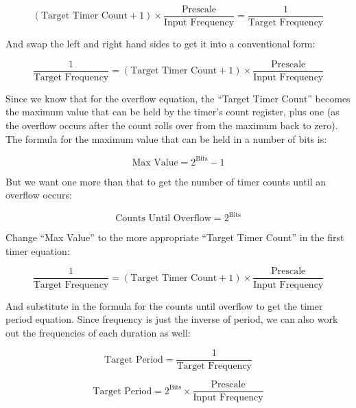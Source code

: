 \documentclass[a4paper,oneside,notitlepage]{book}
\begin{document}
\begin{displaymath}
(\text{Target Timer Count} + 1) \times \frac{\text{Prescale}}{\text{Input Frequency}} = \frac{1}{\text{Target Frequency}}
\end{displaymath}

And swap the left and right hand sides to get it into a conventional form:

\begin{displaymath}
\frac{1}{\text{Target Frequency}} = (\text{Target Timer Count} + 1) \times \frac{\text{Prescale}}{\text{Input Frequency}}
\end{displaymath}

Since we know that for the overflow equation, the ``Target Timer Count'' becomes the maximum value that can be held by the timer's count register, plus one (as the overflow occurs after the count rolls over from the maximum back to zero). The formula for the maximum value that can be held in a number of bits is:

\begin{displaymath}
\text{Max Value} = 2^\text{Bits} - 1
\end{displaymath}

But we want one more than that to get the number of timer counts until an overflow occurs:

\begin{displaymath}
\text{Counts Until Overflow} = 2^\text{Bits}
\end{displaymath}

Change ``Max Value'' to the more appropriate ``Target Timer Count'' in the first timer equation:

\begin{displaymath}
\frac{1}{\text{Target Frequency}} = (\text{Target Timer Count} + 1) \times \frac{\text{Prescale}}{\text{Input Frequency}}
\end{displaymath}

And substitute in the formula for the counts until overflow to get the timer period equation. Since frequency is just the inverse of period, we can also work out the frequencies of each duration as well:

\begin{displaymath}
\text{Target Period} = \frac{1}{\text{Target Frequency}}
\end{displaymath}

\begin{displaymath}
\text{Target Period} = 2^\text{Bits} \times \frac{\text{Prescale}}{\text{Input Frequency}}
\end{displaymath}
\end{document}
